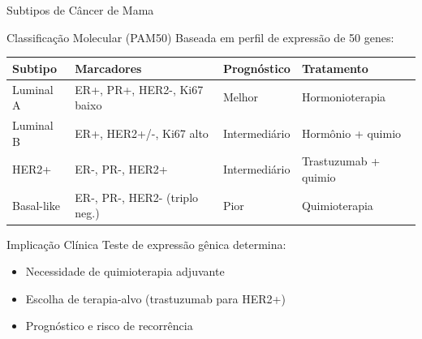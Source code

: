 \begin{frame}{Subtipos de Câncer de Mama}
\begin{block}{Classificação Molecular (PAM50)}
Baseada em perfil de expressão de 50 genes:

\begin{center}
\begin{tabular}{llll}
\toprule
\textbf{Subtipo} & \textbf{Marcadores} & \textbf{Prognóstico} & \textbf{Tratamento} \\
\midrule
Luminal A & ER+, PR+, HER2-, Ki67 baixo & Melhor & Hormonioterapia \\
Luminal B & ER+, HER2+/-, Ki67 alto & Intermediário & Hormônio + quimio \\
HER2+ & ER-, PR-, HER2+ & Intermediário & Trastuzumab + quimio \\
Basal-like & ER-, PR-, HER2- (triplo neg.) & Pior & Quimioterapia \\
\bottomrule
\end{tabular}
\end{center}
\end{block}

\vspace{0.3cm}


\begin{exampleblock}{Implicação Clínica}
Teste de expressão gênica determina:
\begin{itemize}
    \item Necessidade de quimioterapia adjuvante
    \item Escolha de terapia-alvo (trastuzumab para HER2+)
    \item Prognóstico e risco de recorrência
\end{itemize}
\end{exampleblock}
\end{frame}

